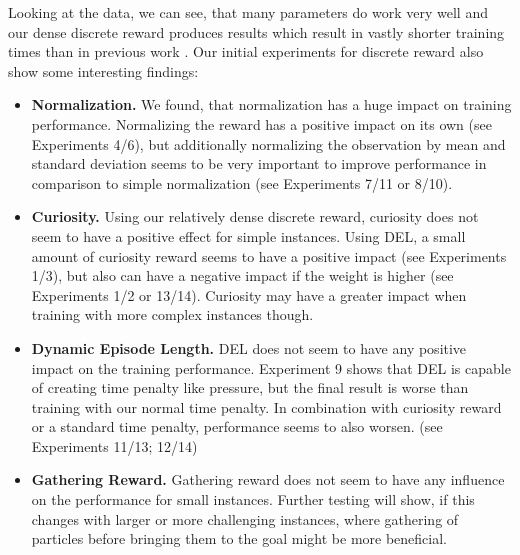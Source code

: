 Looking at the data, we can see, that many parameters do work very well and our dense discrete reward produces results which result in vastly shorter training times than in previous work \cite{huang2019}. Our initial experiments for discrete reward also show some interesting findings: 
\begin{itemize}
    \item \textbf{Normalization. } We found, that normalization has a huge impact on training performance. Normalizing the reward has a positive impact on its own (see Experiments 4/6), but additionally normalizing the observation by mean and standard deviation seems to be very important to improve performance in comparison to simple normalization (see Experiments 7/11 or 8/10).
    \item \textbf{Curiosity. } Using our relatively dense discrete reward, curiosity does not seem to have a positive effect for simple instances. Using DEL, a small amount of curiosity reward seems to have a positive impact (see Experiments 1/3), but also can have a negative impact if the weight is higher (see Experiments 1/2 or 13/14). Curiosity may have a greater impact when training with more complex instances though.
    \item \textbf{Dynamic Episode Length. } DEL does not seem to have any positive impact on the training performance. Experiment 9 shows that DEL is capable of creating time penalty like pressure, but the final result is worse than training with our normal time penalty. In combination with curiosity reward or a standard time penalty, performance seems to also worsen. (see Experiments 11/13; 12/14)
    \item \textbf{Gathering Reward. } Gathering reward does not seem to have any influence on the performance for small instances. Further testing will show, if this changes with larger or more challenging instances, where gathering of particles before bringing them to the goal might be more beneficial.
\end{itemize}


